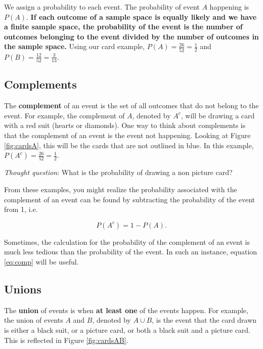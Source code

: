 \documentclass[
]{book}
\begin{document}
We assign a probability to each event. The probability of event \(A\) happening is \(P(A)\). \textbf{If each outcome of a sample space is equally likely and we have a finite sample space, the probability of the event is the number of outcomes belonging to the event divided by the number of outcomes in the sample space.} Using our card example, \(P(A) = \frac{26}{52} = \frac{1}{2}\) and \(P(B) = \frac{12}{52} = \frac{3}{13}\).

\subsection{Complements}\label{complements}

The \textbf{complement} of an event is the set of all outcomes that do not belong to the event. For example, the complement of \(A\), denoted by \(A^c\), will be drawing a card with a red suit (hearts or diamonds). One way to think about complements is that the complement of an event is the event not happening. Looking at Figure \ref{fig:cardsA}, this will be the cards that are not outlined in blue. In this example, \(P(A^c) = \frac{26}{52} = \frac{1}{2}\).

\emph{Thought question}: What is the probability of drawing a non picture card?

From these examples, you might realize the probability associated with the complement of an event can be found by subtracting the probability of the event from 1, i.e.

\begin{equation} 
P(A^c) = 1 - P(A).
\label{eq:comp}
\end{equation}

Sometimes, the calculation for the probability of the complement of an event is much less tedious than the probability of the event. In such an instance, equation \eqref{eq:comp} will be useful.

\subsection{Unions}\label{unions}

The \textbf{union} of events is when \textbf{at least one} of the events happen. For example, the union of events \(A\) and \(B\), denoted by \(A \cup B\), is the event that the card drawn is either a black suit, or a picture card, or both a black suit and a picture card. This is reflected in Figure \ref{fig:cardsAB}.
\end{document}
